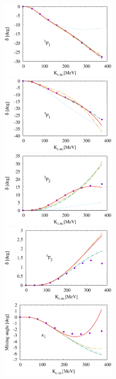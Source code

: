 \documentclass{article}
\begin{document}
\begin{figure}[htbp]

\includegraphics[width=0.5\textwidth]{7_1p1.eps}
\includegraphics[width=0.5\textwidth]{7_3p1.eps}
\includegraphics[width=0.5\textwidth]{7_3p2.eps}
\includegraphics[width=0.5\textwidth]{7_3f2.eps}
\includegraphics[width=0.5\textwidth]{7_e2.eps}

\end{figure}
\end{document}
